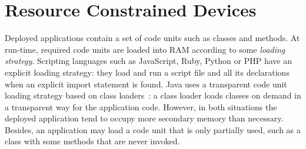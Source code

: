 \section{Resource Constrained Devices}




Deployed applications contain a set of code units such as classes and methods.
At run-time, required code units are loaded into RAM according to some \emph{loading strategy}.
Scripting languages such as JavaScript, Ruby, Python or PHP have an explicit loading strategy: they load and run a script file and all its declarations when an explicit import statement is found. 
Java uses a transparent code unit loading strategy based on class loaders~\cite{ShortLian98a}: a class loader loads classes on demand in a transparent way for the application code.
However, in both situations the deployed application tend to occupy more secondary memory than necessary.
Besides, an application may load a code unit that is only partially used, such as a class with some methods that are never invoked.

